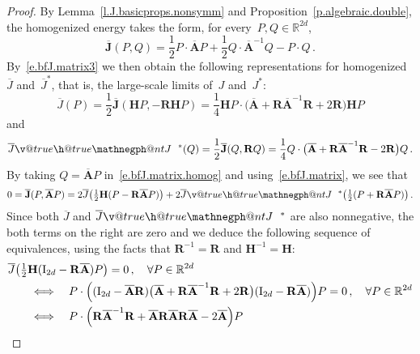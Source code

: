 \documentclass[11pt]{article} %
\makeatletter
\numberwithin{equation}{section}
\theoremstyle{definition}
\newcommand*{\R}{\ensuremath{\mathbb{R}}}
\newcommand{\Jstarbar}{{\overline{J}}\negphantom{J}\phantom{J}^*}
\newcommand{\negphantom}{\v@true\h@true\negph@nt}
\newcommand{\negph@nt}{\ifmmode\expandafter\mathpalette 
  \expandafter\mathnegph@nt\else\expandafter\makenegph@nt\fi}
\newcommand{\makenegph@nt}[1]{%
  \setbox\z@\hbox{\color@begingroup#1\color@endgroup}\finnegph@nt}
\newcommand{\finnegph@nt}{%
  \setbox\tw@\null 
  \ifv@ \ht\tw@\ht\z@\dp\tw@\dp\z@\fi \ifh@\wd\tw@-\wd\z@\fi\box\tw@}
\newcommand{\mathnegph@nt}[2]{%
  \setbox\z@\hbox{$\m@th #1{#2}$}\finnegph@nt}
\newcommand{\bfA}{\mathbf{A}}
\newcommand{\bfJ}{\mathbf{J}}
\newcommand{\rota}{\mathbf{R}}
\newcommand{\refl}{\mathbf{H}}
\makeatother
\begin{document}
\begin{proof}
By Lemma~\ref{l.J.basicprops.nonsymm} and Proposition~\ref{p.algebraic.double}, the homogenized energy takes the form, for every~$P,Q \in \R^{2d}$,  
\begin{equation} \label{e.bfJ.matrix.homog}
\overline{\bfJ}(P,Q) 
=
\frac12 P \cdot \overline{\bfA} P 
+ 
\frac12 Q \cdot \overline{\bfA}^{-1} Q
- P \cdot Q
\,.
\end{equation}
By~\eqref{e.bfJ.matrix3} we then obtain the following representations for homogenized~$\overline{J} $ and~$\overline{J} ^*$, that is, the large-scale limits of~$J$ and~$J^*$:
\begin{equation*}  
\overline{J} (P) 
= 
\frac12 \overline{\bfJ}(\refl P,-\rota \refl P) 
=
\frac14 \refl P \cdot \bigl(\overline{\bfA}    + \rota \overline{\bfA}^{-1} \rota + 2\rota  \bigr) \refl P 
\end{equation*}
and
\begin{equation*}  
\Jstarbar (Q) 
= 
\frac12 \overline{\bfJ}(Q,\rota Q) 
=
\frac14 Q\cdot \bigl(\overline{\bfA}    + \rota \overline{\bfA}^{-1} \rota - 2\rota  \bigr) Q  
\,.
\end{equation*}
By taking $Q = \overline{\bfA} P$ in~\eqref{e.bfJ.matrix.homog} and using~\eqref{e.bfJ.matrix}, we see that 
\begin{equation*}  
0 
= 
\overline{\bfJ}(P, \overline{\bfA} P) 
= 
2 \overline{J} \bigl( \tfrac12 \refl (P - \rota \overline{\bfA} P) \bigr)  
+
2 \Jstarbar \bigl( \tfrac12  (P + \rota \overline{\bfA} P) \bigr)   
\,.
\end{equation*}
Since both $\overline{J} $ and $\Jstarbar$ are also nonnegative, the both terms on the right are zero and we deduce the following sequence of equivalences, using the facts that $\rota^{-1} = \rota$ and $\refl^{-1} = \refl$:
\begin{align} \notag \label{e.invA.is.RAR}
\lefteqn{
\overline{J} \bigl( \tfrac12 \refl ( \mathrm{I}_{2d} - \rota \overline{\bfA} ) P \bigr)  = 0  
\,, \quad \forall P \in \R^{2d} 
} \qquad & 
\notag \\ & 
\Longleftrightarrow \quad
P \cdot \Bigl( ( \mathrm{I}_{2d} - \overline{\bfA} \rota ) \bigl(\overline{\bfA}    + \rota \overline{\bfA}^{-1} \rota + 2\rota  \bigr) ( \mathrm{I}_{2d} - \rota \overline{\bfA}  )   \Bigr) P  = 0 
\,, \quad \forall P \in \R^{2d} 
\notag \\ & 
\Longleftrightarrow \quad
P \cdot \Bigl(  \rota \overline{\bfA}^{-1} \rota + \overline{\bfA} \rota \overline{\bfA} \rota \overline{\bfA} - 2 \overline{\bfA}    \Bigr) P  

\end{align}
\end{proof}
\end{document}

